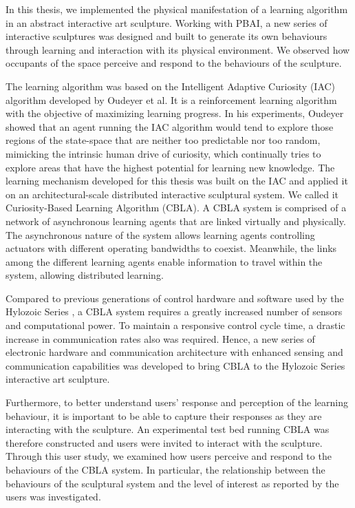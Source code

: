 In this thesis, we implemented the physical manifestation of a learning algorithm in an abstract interactive art sculpture. Working with PBAI, a new series of interactive sculptures was designed and built to generate its own behaviours through learning and interaction with its physical environment. We observed how occupants of the space perceive and respond to the behaviours of the sculpture. 

The learning algorithm was based on the Intelligent Adaptive Curiosity \cite{Oudeyer2007} (IAC) algorithm developed by Oudeyer et al. It is a reinforcement learning algorithm with the objective of maximizing learning progress. In his experiments, Oudeyer showed that an agent running the IAC algorithm would tend to explore those regions of the state-space that are neither too predictable nor too random, mimicking the intrinsic human drive of curiosity, which continually tries to explore areas that have the highest potential for learning new knowledge. The learning mechanism developed for this thesis was built on the IAC and applied it on an architectural-scale distributed interactive sculptural system. We called it Curiosity-Based Learning Algorithm (CBLA). A CBLA system is comprised of a network of asynchronous learning agents that are linked virtually and physically. The asynchronous nature of the system allows learning agents controlling actuators with different operating bandwidths to coexist. Meanwhile, the links among the different learning agents enable information to travel within the system, allowing distributed learning.

Compared to previous generations of control hardware and software used by the Hylozoic Series \cite{Beesley2010-1}, a CBLA system requires a greatly increased number of sensors and computational power. To maintain a responsive control cycle time, a drastic increase in communication rates also was required. Hence, a new series of electronic hardware and communication architecture with enhanced sensing and communication capabilities was developed to bring CBLA to the Hylozoic Series interactive art sculpture. 

Furthermore, to better understand users' response and perception of the learning behaviour, it is important to be able to capture their responses as they are interacting with the sculpture. An experimental test bed running CBLA was therefore constructed and users were invited to interact with the sculpture. Through this user study, we examined how users perceive and respond to the behaviours of the CBLA system. In particular, the relationship between the behaviours of the sculptural system and the level of interest as reported by the users was investigated. 

